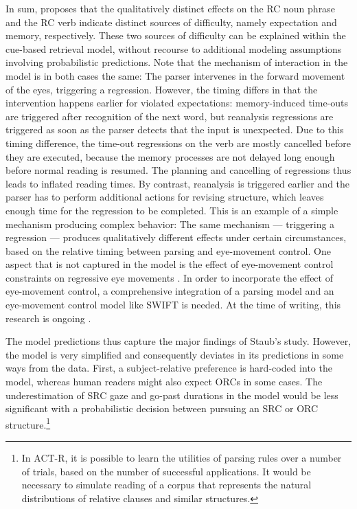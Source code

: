 \documentclass{cambridge7A}\usepackage[]{graphicx}\usepackage[]{color}
\begin{document}
In sum, \cite{Staub2010a} proposes that the qualitatively distinct effects on the RC noun phrase and the RC verb indicate distinct sources of difficulty, namely expectation and memory, respectively. These two sources of difficulty can be explained within the cue-based retrieval model, without recourse to additional modeling assumptions involving  probabilistic predictions. Note that the mechanism of interaction in the model is in both cases the same: The parser intervenes in the forward movement of the eyes, triggering a regression. However, the timing differs in that the intervention happens earlier for violated expectations: memory-induced time-outs are triggered after recognition of the next word, but reanalysis regressions are triggered as soon as the parser detects that the input is unexpected. Due to this timing difference, the time-out regressions on the verb are mostly cancelled before they are executed, because the memory processes are not delayed long enough before normal reading is resumed. The planning and cancelling of regressions thus leads to inflated reading times. By contrast, reanalysis is triggered earlier and the parser has to perform additional actions for revising structure, which leaves enough time for the regression to be completed. 
This is an example of a simple mechanism producing complex behavior: The same mechanism --- triggering a regression ---  produces qualitatively different effects under certain circumstances, based on the relative timing between parsing and eye-movement control. One aspect that is not captured in the model is the effect of eye-movement control constraints on regressive eye movements \citep{EngbertNuthmannRichter2005}. In order to incorporate the effect of eye-movement control, a comprehensive integration of a parsing model and an eye-movement control model like SWIFT is needed. At the time of writing, this research is ongoing \citep{Rabe2019}.

The model predictions thus capture the major findings of Staub's study. However, the model is very simplified and consequently deviates in its predictions in some ways from the data.
First, a subject-relative preference is hard-coded into the model, whereas human readers might also expect ORCs in some cases. The underestimation of SRC gaze and go-past durations in the model would be less significant with a probabilistic decision between pursuing an SRC or ORC structure.\footnote{In ACT-R, it is possible to learn the utilities of parsing rules over a number of trials, based on the number of successful applications. It would be necessary to simulate reading of a corpus that represents the natural distributions of relative clauses and similar structures.}
\end{document}
